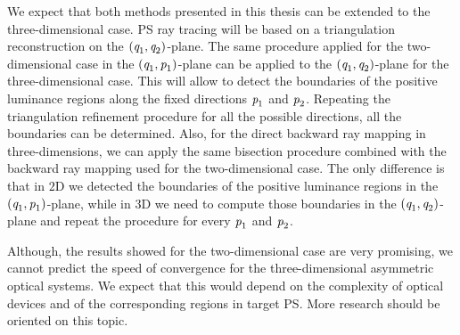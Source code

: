
We expect that both methods presented in this thesis can be extended to the three-dimensional case. PS ray tracing will be based on a triangulation reconstruction on the $(\textit{q}_1, \textit{q}_2)$-plane. The same procedure applied for the two-dimensional case in the $(\textit{q}_1, \textit{p}_1)$-plane can be applied to the $(\textit{q}_1, \textit{q}_2)$-plane for the three-dimensional case. This will allow to detect the boundaries of the positive luminance regions along the fixed directions $\textit{p}_1$ and $\textit{p}_2$. Repeating the triangulation refinement procedure for all the possible directions, all the boundaries can be determined. Also, for the direct backward ray mapping in three-dimensions, we can apply the same bisection procedure combined with the backward ray mapping used for the two-dimensional case. The only difference is that in $2$D we detected the boundaries of the positive luminance regions in the $(\textit{q}_1, \textit{p}_1)$-plane, while in $3$D we need to compute those boundaries in the $(\textit{q}_1, \textit{q}_2)$-plane and repeat the procedure for every $\textit{p}_1$ and $\textit{p}_2$.

Although, the results showed for the two-dimensional case are very promising, we cannot predict the speed of convergence for the three-dimensional asymmetric optical systems. We expect that this would depend on the complexity of optical devices and of the corresponding regions in target PS. More research should be oriented on this topic.
